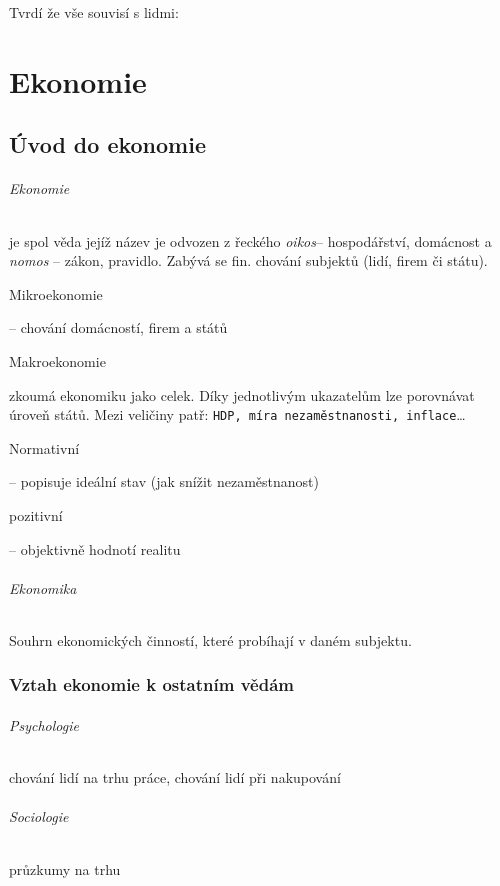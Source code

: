 \documentclass[10pt,a4paper,
twoside,%
]{report}
\begin{document}
Tvrdí že vše souvisí s lidmi:
\emph{}


\part{Ekonomie}

\chapter{Úvod do ekonomie}


\paragraph{Ekonomie} je spol věda jejíž název je odvozen z řeckého \emph{oikos}-- hospodářství, domácnost a \emph{nomos} -- zákon, pravidlo. Zabývá se fin. chování subjektů (lidí, firem či státu).
\subparagraph{Mikroekonomie} -- chování  domácností, firem a států

\subparagraph{Makroekonomie} zkoumá ekonomiku jako celek. Díky jednotlivým ukazatelům lze porovnávat úroveň států. Mezi veličiny patř: \texttt{HDP, míra nezaměstnanosti, inflace}\dots

\subparagraph{Normativní} -- popisuje ideální stav (jak snížit nezaměstnanost)

\subparagraph{pozitivní} -- objektivně hodnotí realitu

\paragraph{Ekonomika} Souhrn ekonomických činností, které probíhají v daném subjektu.
\section{Vztah ekonomie k ostatním vědám}
\paragraph{Psychologie} chování lidí na trhu práce, chování lidí při nakupování

\paragraph{Sociologie} průzkumy na trhu
\end{document}
